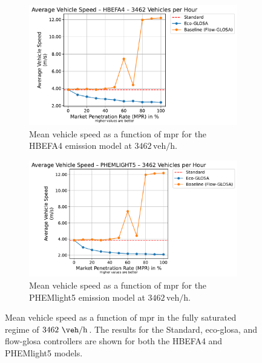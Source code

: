 \begin{figure}[htbp]
  \centering
  \begin{subfigure}[b]{0.98\textwidth}
    \includegraphics[width=\textwidth]{data/img/AverageVehicleSpeed/AverageVehicleSpeed_HBEFA4_Cars3462.pdf}
    \caption{Mean vehicle speed as a function of \ac{mpr} for the HBEFA4 emission model at $3462\,\mathrm{veh/h}$.}
    \label{fig:MeanSpeed_HBEFA4_3462}
  \end{subfigure}
  \begin{subfigure}[b]{0.98\textwidth}
    \includegraphics[width=\textwidth]{data/img/AverageVehicleSpeed/AverageVehicleSpeed_PHEMLIGHT5_Cars3462.pdf}
    \caption{Mean vehicle speed as a function of \ac{mpr} for the PHEMlight5 emission model at $3462\,\mathrm{veh/h}$.}
    \label{fig:MeanSpeed_PHEM_3462}
  \end{subfigure}
  \caption[Mean vehicle speed vs. \ac{mpr} at $3462~\unit{\veh\per\hour}$]{Mean vehicle speed as a function of \ac{mpr} in the fully saturated regime of $3462~\unit{\veh\per\hour}$. The results for the Standard, \ac{eco-glosa}, and \ac{flow-glosa} controllers are shown for both the HBEFA4 and PHEMlight5 models.}
\label{fig:MeanSpeed_3462}
\end{figure}

